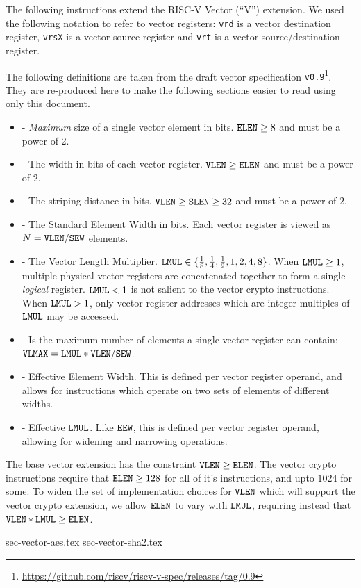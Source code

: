 
The following instructions extend the RISC-V Vector (``V'') extension.
We used the following notation to refer to vector registers:
{\tt vrd}  is a vector        destination register,
{\tt vrsX} is a vector source             register
and
{\tt vrt}  is a vector source/destination register.

The following definitions are taken from the draft
vector specification {\tt v0.9}\footnote{\url{https://github.com/riscv/riscv-v-spec/releases/tag/0.9}}.
They are re-produced here to make the following sections easier to
read using only this document.

\begin{itemize}
\item[\ELEN] - {\em Maximum} size of a single vector element in bits.
              ${\tt ELEN} \ge 8$ and must be a power of $2$.
\item[\VLEN] - The width in bits of each vector register.
              ${\tt VLEN} \ge {\tt ELEN}$ and must be a power of $2$.
\item[\SLEN] - The striping distance in bits.
              ${\tt VLEN} \ge {\tt SLEN} \ge 32$ and must be a power of $2$.
\item[\SEW]  - The Standard Element Width in bits.
              Each vector register is viewed as $N={\tt VLEN}/{\tt SEW}$ elements.
\item[\LMUL] - The Vector Length Multiplier.
              ${\tt LMUL}\in\{{1\over 8},{1\over 4},{1\over 2},1,2,4,8\}$.
              When ${\tt LMUL}\ge1$, multiple physical vector registers are
              concatenated together to form a single {\em logical} register.
              ${\tt LMUL}<1$ is not salient to the vector crypto instructions.
              When ${\tt LMUL}>1$, only vector register addresses which are
              integer multiples of ${\tt LMUL}$ may be accessed.
\item[\VLMAX]- Is the maximum number of elements a single vector register
              can contain: ${\tt VLMAX}={\tt LMUL}*{\tt VLEN}/{\tt SEW}$.
\item[\EEW]  - Effective Element Width. This is defined per vector register
              operand, and allows for instructions which operate on
              two sets of elements of different widths.
\item[\EMUL] - Effective ${\tt LMUL}$. Like ${\tt EEW}$, this is defined per vector
              register operand, allowing for widening and narrowing
              operations.
\end{itemize}

The base vector extension has the constraint ${\tt VLEN} \ge {\tt ELEN}$.
The vector crypto instructions require that ${\tt ELEN} \ge 128$ for all
of it's instructions, and upto $1024$ for some.
To widen the set of implementation choices for ${\tt VLEN}$ which will support
the vector crypto extension, we allow ${\tt ELEN}$ to vary with ${\tt LMUL}$,
requiring instead that ${\tt VLEN}*{\tt LMUL} \ge {\tt ELEN}$.


{sec-vector-aes.tex}
{sec-vector-sha2.tex}

